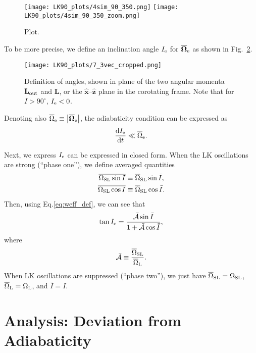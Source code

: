 \documentclass[
        fleqn,
        usenatbib,
    ]{mnras}
\newcommand*{\rd}[2]{\frac{\mathrm{d}#1}{\mathrm{d}#2}}
\newcommand*{\abs}[1]{\left|#1\right|}
\newcommand*{\bm}[1]{\boldsymbol{\mathbf{#1}}}
\newcommand*{\uv}[1]{\hat{\bm{#1}}}
\begin{document}
\begin{figure}
    \centering
    \texttt{[image: LK90\_plots/4sim\_90\_350.png]}
    \texttt{[image: LK90\_plots/4sim\_90\_350\_zoom.png]}
    \caption{Plot.}\label{fig:4sim_90_350}
\end{figure}

To be more precise, we define an inclination angle $I_{\rm e}$ for
$\bm{\overline{\Omega}}_{\rm e}$ as shown in Fig.~\ref{fig:3vec}.
\begin{figure}
    \centering
    \texttt{[image: LK90\_plots/7\_3vec\_cropped.png]}
    \caption{Definition of angles, shown in plane of the two angular momenta
    $\bm{L}_{\rm out}$ and $\bm{L}$, or the $\uv{x}$--$\uv{z}$ plane in the
    corotating frame. Note that for $I > 90^\circ$, $I_{\rm e} <
    0$.}\label{fig:3vec}
\end{figure}
Denoting also $\overline{\Omega}_{\rm e} \equiv \abs{\bm{\overline{\Omega}}_{\rm
e}}$, the adiabaticity condition can be expressed as
\begin{equation}
    \rd{I_{\rm e}}{t} \ll \overline{\Omega}_{\rm e}.\label{eq:ad_constr_idot}
\end{equation}

Next, we express $I_{\rm e}$ can be expressed in closed form. When the LK
oscillations are strong (``phase one''), we define averaged quantities
\begin{align}
    \overline{\Omega_{\rm SL} \sin I} &\equiv
            \overline{\Omega}_{\rm SL} \sin \bar{I},\\
    \overline{\Omega_{\rm SL} \cos I} &\equiv
            \overline{\Omega}_{\rm SL} \cos \bar{I}.
\end{align}
Then, using Eq.\eqref{eq:weff_def}, we can see that
\begin{equation}
    \tan I_{\rm e} = \frac{\bar{\mathcal{A}}\sin \bar{I}}{
        1 + \bar{\mathcal{A}}\cos \bar{I}},\label{eq:ie_def}
\end{equation}
where
\begin{equation}
    \bar{\mathcal{A}} \equiv \frac{\overline{\Omega}_{\rm SL}}{
        \overline{\Omega}_{\rm L}}.
\end{equation}
When LK oscillations are suppressed (``phase two''), we just have
$\overline{\Omega}_{\rm SL} = \Omega_{\rm SL}$, $\overline{\Omega}_{\rm L} =
\Omega_{\rm L}$, and $\bar{I} = I$.

\section{Analysis: Deviation from Adiabaticity}
\end{document}

